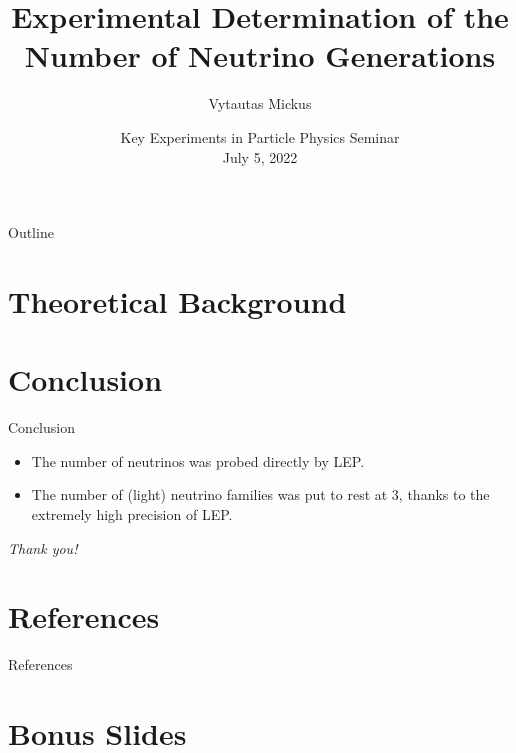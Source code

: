 \documentclass[10pt]{beamer}
\title[Number of Neutrinos]{
    Experimental Determination of the Number of Neutrino Generations
}
\author[Vytautas Mickus, 2022]{
    Vytautas Mickus
}
\institute[LMU]{
    University of Munich \\
    \texttt{\href{vytautas.mickus@campus.lmu.de}{vytautas.mickus@campus.lmu.de}}
    }
\date[Key Experiments in Particle Physics, July 5, 2022]{
    Key Experiments in Particle Physics Seminar\\
    July 5, 2022
}
\begin{document}
\begin{frame}
\titlepage
\end{frame}


\begin{frame}{Outline}
    \tableofcontents
\end{frame}






\section{Theoretical Background}



\section{Conclusion}
\begin{frame}{Conclusion}
	\begin{itemize}
		\item The number of neutrinos was probed directly by LEP.
		\item The number of (light) neutrino families was put to rest at 3, thanks to the extremely high precision of LEP.
	\end{itemize}
\end{frame}



\begin{frame}{}
    \centering \Large
    \emph{Thank you!}
  \end{frame}

\section*{References}
\begin{frame}[allowframebreaks]{References}
% 
%
\printbibliography
\end{frame}


\section*{Bonus Slides}
\end{document}
